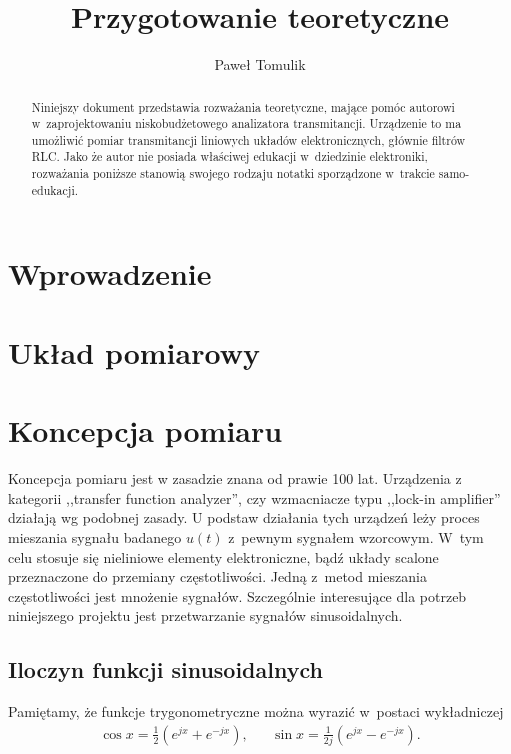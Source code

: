 \documentclass[paper=a4,DIV=12]{tfa}
\begin{document}
\title{Przygotowanie teoretyczne}
\author{Paweł Tomulik}
\date{}
\maketitle

\begin{abstract}
  Niniejszy dokument przedstawia rozważania teoretyczne, mające pomóc autorowi
  w~zaprojektowaniu niskobudżetowego analizatora transmitancji. Urządzenie to
  ma umożliwić pomiar transmitancji liniowych układów elektronicznych, głównie
  filtrów RLC. Jako że autor nie posiada właściwej edukacji w~dziedzinie
  elektroniki, rozważania poniższe stanowią swojego rodzaju notatki sporządzone
  w~trakcie samo-edukacji.
\end{abstract}

\section{Wprowadzenie}
\label{sec:G1J9K}

\section{Układ pomiarowy}
\label{sec:NMQFB}

\section{Koncepcja pomiaru}
\label{sec:6C4QN}

Koncepcja pomiaru jest w zasadzie znana od prawie 100 lat. Urządzenia z
kategorii ,,transfer function analyzer'', czy wzmacniacze typu ,,lock-in
amplifier'' działają wg podobnej zasady. U podstaw działania tych urządzeń leży
proces mieszania sygnału badanego $u(t)$ z~pewnym sygnałem wzorcowym. W~tym
celu stosuje się nieliniowe elementy elektroniczne, bądź układy scalone
przeznaczone do przemiany częstotliwości. Jedną z~metod mieszania
częstotliwości jest mnożenie sygnałów. Szczególnie interesujące dla potrzeb
niniejszego projektu jest przetwarzanie sygnałów sinusoidalnych.

\subsection{Iloczyn funkcji sinusoidalnych}
\label{sec:NZPSA}

Pamiętamy, że funkcje trygonometryczne można wyrazić w~postaci wykładniczej
\begin{align}
  & \cos x = \frac{1}{2} \left( e^{jx} + e^{-jx}\right), &
  & \sin x = \frac{1}{2j} \left( e^{jx} - e^{-jx}\right). &
  \label{eq:7R2OT}
\end{align}
\end{document}
